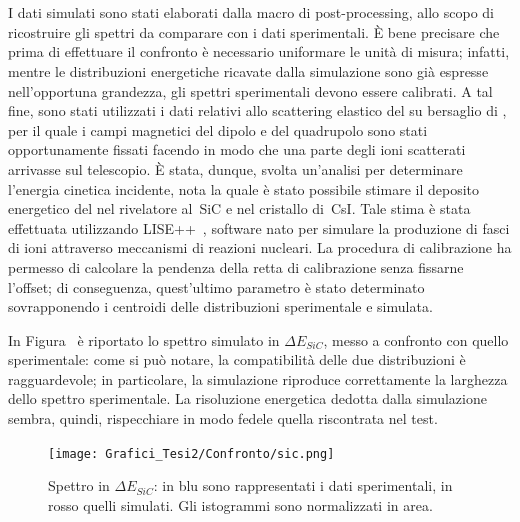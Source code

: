 \section{}




I dati simulati sono stati elaborati dalla macro di post-processing, allo scopo di ricostruire gli spettri da comparare con i dati sperimentali.
È bene precisare che prima di effettuare il confronto è necessario uniformare le unità di misura; infatti, mentre le distribuzioni energetiche ricavate dalla simulazione sono già espresse nell'opportuna grandezza, gli spettri sperimentali devono essere calibrati.
A tal fine, sono stati utilizzati i dati relativi allo scattering elastico del  su bersaglio di , per il quale i campi magnetici del dipolo e del quadrupolo sono stati opportunamente fissati facendo in modo che una parte degli ioni scatterati arrivasse sul telescopio.
È stata, dunque, svolta un'analisi per determinare l'energia cinetica incidente, nota la quale è stato possibile stimare il deposito energetico del  nel rivelatore al~SiC e nel cristallo di~CsI.
Tale stima è stata effettuata utilizzando LISE++~\cite{tarasov:nimb08}, software nato per simulare la produzione di fasci di ioni attraverso meccanismi di reazioni nucleari.
La procedura di calibrazione ha permesso di calcolare la pendenza della retta di calibrazione senza fissarne l'offset; di conseguenza, quest'ultimo parametro è stato determinato sovrapponendo i centroidi delle distribuzioni sperimentale e simulata.

In Figura~ è riportato lo spettro simulato in $\Delta E_{SiC}$, messo a confronto con quello sperimentale: come si può notare, la compatibilità delle due distribuzioni è ragguardevole; in particolare, la simulazione riproduce correttamente la larghezza dello spettro sperimentale.
La risoluzione energetica dedotta dalla simulazione sembra, quindi, rispecchiare in modo fedele quella riscontrata nel test.
\begin{figure} [!p]
	\centering
	\texttt{[image: Grafici\_Tesi2/Confronto/sic.png]}
	\caption{Spettro in $\Delta E_{SiC}$: in blu sono rappresentati i dati sperimentali, in rosso quelli simulati. Gli istogrammi sono normalizzati in area.} \label{fig:spettro_sic_confronto}
\end{figure}

